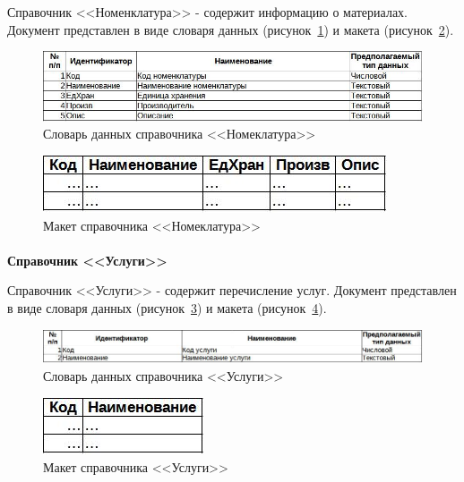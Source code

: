 \documentclass[12pt, a4paper, simple]{eskdtext}
\begin{document}
    Справочник <<Номенклатура>> - содержит информацию о материалах.
    Документ представлен в виде словаря данных (рисунок~\ref{fig:CP_Nomenkl_tipi})
    и макета (рисунок~\ref{fig:CP_Nomenkl_maket}).

    \begin{figure}[!h]
        \centering
        \includegraphics[width=14cm]
            {_docs/СП_Номенкл_типы.jpg}
        \caption{Словарь данных справочника <<Номеклатура>>}
        \label{fig:CP_Nomenkl_tipi}
    \end{figure}

    \begin{figure}[!h]
        \centering
        \includegraphics[]
            {_docs/СП_Номенкл_макет.jpg}
        \caption{Макет справочника <<Номеклатура>>}
        \label{fig:CP_Nomenkl_maket}
    \end{figure}

    \paragraph{} \textbf{Справочник <<Услуги>>}

    Справочник <<Услуги>> - содержит перечисление услуг.
    Документ представлен в виде словаря данных (рисунок~\ref{fig:CP_Yslygi_tipi})
    и макета (рисунок~\ref{fig:CP_Yslygi_maket}).

    \begin{figure}[!h]
        \centering
        \includegraphics[width=14cm]
            {_docs/СП_Услуги_типы.jpg}
        \caption{Словарь данных справочника <<Услуги>>}
        \label{fig:CP_Yslygi_tipi}
    \end{figure}

    \begin{figure}[!h]
        \centering
        \includegraphics[]
            {_docs/СП_Услуги_макет.jpg}
        \caption{Макет справочника <<Услуги>>}
        \label{fig:CP_Yslygi_maket}
    \end{figure}
\end{document}
